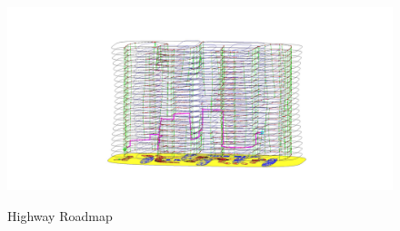 \documentclass{article}
\begin{document}
\begin{enumerate}
\begin{enumerate}
\begin{figure}
\centering
\includegraphics[scale = 0.2]{path_3d.jpg}
\label{fig:path_3d}
\caption{Highway Roadmap}
\end{figure}
	
\end{enumerate}

\end{enumerate}
\end{document}
